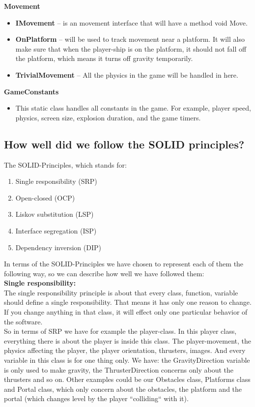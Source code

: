 \documentclass[../master.tex]{subfiles}
\begin{document}
\textbf{Movement}
\begin{itemize}
	\item[] \textbf{IMovement} -- is an movement interface that will have a method void Move.
	\item[] \textbf{OnPlatform} -- will be used to track movement near a platform. It will also make sure that when the player-ship is on the platform, it should not fall off the platform, which means it turns off gravity temporarily.
	\item[] \textbf{TrivialMovement} -- All the physics in the game will be handled in here.\\
\end{itemize}

\textbf{GameConstants}
\begin{itemize}
	\item[] This static class handles all constants in the game. For example, player speed, physics, screen size, explosion duration, and the game timers.
\end{itemize}

\subsection{How well did we follow the SOLID principles?}
The SOLID-Principles, which stands for:
\begin{enumerate}
	\item Single responsibility (SRP)
	\item Open-closed (OCP)
	\item Liskov substitution (LSP)
	\item Interface segregation (ISP)
	\item Dependency inversion (DIP)
\end{enumerate}

In terms of the SOLID-Principles we have chosen to represent each of them the following way, so we can describe how well we have followed them:\\

\noindent\textbf{Single responsibility:}\\
The single responsibility principle is about that every class, function, variable should define a single responsibility. That means it has only one reason to change. If you change anything in that class, it will effect only one particular behavior of the software.\\

\noindent So in terms of SRP we have for example the player-class. In this player class, everything there is about the player is inside this class. The player-movement, the physics affecting the player, the player orientation, thrusters, images. And every variable in this class is for one thing only. We have: the GravityDirection variable is only used to make gravity, the ThrusterDirection concerns only about the thrusters and so on. Other examples could be our Obstacles class, Platforms class and Portal class, which only concern about the obstacles, the platform and the portal (which changes level by the player ``colliding`` with it).\\
\end{document}
